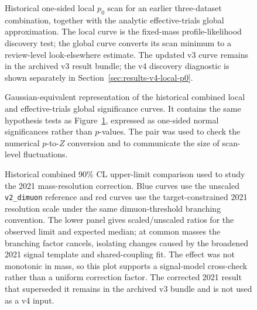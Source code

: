 \begin{figure}[p]
\centering
{}
\caption{Historical one-sided local $p_0$ scan for an earlier three-dataset
combination, together with the analytic effective-trials global approximation. The
local curve is the fixed-mass profile-likelihood discovery test; the global curve
converts its scan minimum to a review-level look-elsewhere estimate. The updated v3
curve remains in the archived v3 result bundle; the v4 discovery diagnostic is shown
separately in Section~\ref{sec:results-v4-local-p0}.}
\label{fig:combined-significance-rpen}
\end{figure}

\begin{figure}[p]
\centering
{}
\caption{Gaussian-equivalent representation of the historical combined local and
effective-trials global significance curves. It contains the same hypothesis tests as
Figure~\ref{fig:combined-significance-rpen}, expressed as one-sided normal
significances rather than $p$-values. The pair was used to check the numerical
$p$-to-$Z$ conversion and to communicate the size of scan-level fluctuations.}
\label{fig:app-combined-significance-z}
\end{figure}

\begin{figure}[p]
\centering
{}
\caption{Historical combined 90\% CL upper-limit comparison used to study the 2021
mass-resolution correction. Blue curves use the unscaled \texttt{v2\_dimuon}
reference and red curves use the target-constrained 2021 resolution scale under the
same dimuon-threshold branching convention. The lower panel gives scaled/unscaled
ratios for the observed limit and expected median; at common masses the branching
factor cancels, isolating changes caused by the broadened 2021 signal template and
shared-coupling fit. The effect was not monotonic in mass, so this plot supports a
signal-model cross-check rather than a uniform correction factor. The corrected 2021
result that superseded it remains in the archived v3 bundle and is not used as a v4
input.}
\label{fig:app-2021-resolution-comparison}
\end{figure}

